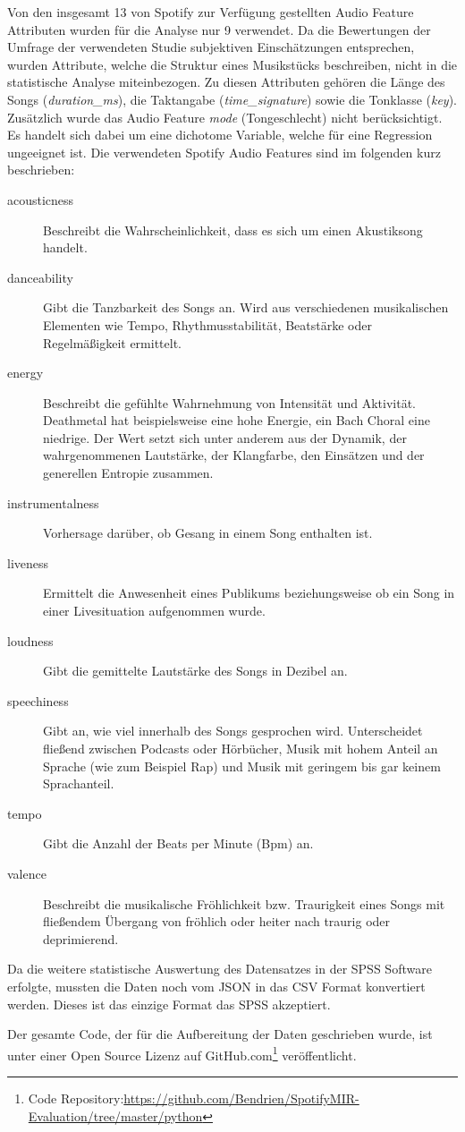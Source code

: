 Von den insgesamt 13 von Spotify zur Verfügung gestellten Audio Feature Attributen wurden für die Analyse nur 9 verwendet.
Da die Bewertungen der Umfrage der verwendeten Studie subjektiven Einschätzungen entsprechen, wurden Attribute, welche die Struktur eines Musikstücks beschreiben, nicht in die statistische Analyse miteinbezogen.
Zu diesen Attributen gehören die Länge des Songs (\textit{duration\_ms}), die Taktangabe (\textit{time\_signature}) sowie die Tonklasse (\textit{key}).
Zusätzlich wurde das Audio Feature \textit{mode} (Tongeschlecht) nicht berücksichtigt. Es handelt sich dabei um eine dichotome Variable, welche für eine Regression ungeeignet ist.
Die verwendeten Spotify Audio Features sind im folgenden kurz beschrieben:

\begin{description}
    \item[acousticness]
        Beschreibt die Wahrscheinlichkeit, dass  es sich um einen Akustiksong handelt.
    \item[danceability]
        Gibt die Tanzbarkeit des Songs an.
        Wird aus verschiedenen musikalischen Elementen wie Tempo, Rhythmusstabilität, Beatstärke oder Regelmäßigkeit ermittelt.
    \item[energy]
        Beschreibt die gefühlte Wahrnehmung von Intensität und Aktivität.
        Deathmetal hat beispielsweise eine hohe Energie, ein Bach Choral eine niedrige. Der Wert setzt sich unter anderem aus der Dynamik, der wahrgenommenen Lautstärke, der Klangfarbe, den Einsätzen und der generellen Entropie zusammen.
    \item[instrumentalness]
        Vorhersage darüber, ob Gesang in einem Song enthalten ist.
    \item[liveness]
        Ermittelt die Anwesenheit eines Publikums beziehungsweise ob ein Song in einer Livesituation aufgenommen wurde.
    \item[loudness]
        Gibt die gemittelte Lautstärke des Songs in Dezibel an.
    \item[speechiness]
        Gibt an, wie viel innerhalb des Songs gesprochen wird.
        Unterscheidet fließend zwischen Podcasts oder Hörbücher, Musik mit hohem Anteil an Sprache (wie zum Beispiel Rap) und Musik mit geringem bis gar keinem Sprachanteil.
    \item[tempo]
        Gibt die Anzahl der Beats per Minute (Bpm) an.
    \item[valence]
        Beschreibt die musikalische Fröhlichkeit bzw. Traurigkeit eines Songs mit fließendem Übergang von fröhlich oder heiter 			nach traurig oder deprimierend.
\end{description}

Da die weitere statistische Auswertung des Datensatzes in der SPSS Software erfolgte, mussten die Daten noch vom JSON in das CSV Format konvertiert werden.
Dieses ist das einzige Format das SPSS akzeptiert.

Der gesamte Code, der für die Aufbereitung der Daten geschrieben wurde, ist unter einer Open Source Lizenz auf GitHub.com\footnote{Code Repository:\hfill \url{https://github.com/Bendrien/SpotifyMIR-Evaluation/tree/master/python}} veröffentlicht.

